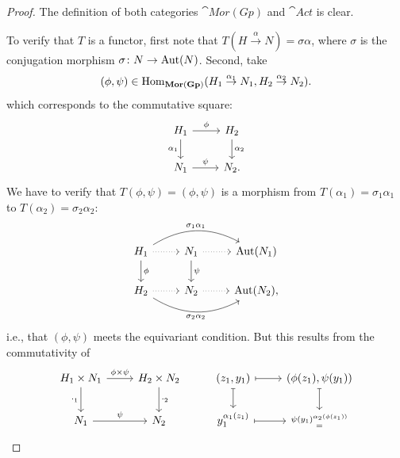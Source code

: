 \begin{proof}
    The definition of both categories $\cat{Mor(Gp)}$ and $\cat{Act}$ is clear.
    
    To verify that $T$ is a functor, first note that $T(H\stackrel\alpha\to N)=\sigma\alpha$, where $\sigma$ is the conjugation morphism $\sigma\colon N\to{\rm Aut}(N)$. Second, take 
    $$
        (\phi,\psi)\in{\rm Hom}_{\mathbf{Mor(Gp)}}
            (H_1\stackrel{\alpha_1}\to N_1, H_2\stackrel{\alpha_2}\to N_2).
    $$
    which corresponds to the commutative square:
    $$
        \begin{tikzcd}
            H_1
                    \arrow[r,"\phi"]
                    \arrow[d,"\alpha_1"']
                &H_2
                    \arrow[d,"\alpha_2"]\\
            N_1
                    \arrow[r,"\psi"]
                &N_2.
        \end{tikzcd}
    $$
    We have to verify that $T(\phi,\psi)=(\phi,\psi)$ is a morphism from $T(\alpha_1)=\sigma_1\alpha_1$ to $T(\alpha_2)=\sigma_2\alpha_2$:
    $$
        \begin{tikzcd}
            H_1
                    \arrow[r,dotted]
                    \arrow[d,"\phi"]
                    \arrow[rr,"\sigma_1\alpha_1",bend left]
                &N_1
                    \arrow[r,dotted]
                    \arrow[d,"\psi"]
                &\Aut(N_1)\\
            H_2
                    \arrow[r,dotted]
                    \arrow[rr,"\sigma_2\alpha_2"',bend right]
                &N_2
                    \arrow[r,dotted]
                &\Aut(N_2),
        \end{tikzcd}
    $$
    i.e., that $(\phi,\psi)$ meets the equivariant condition. But this results from the commutativity of
    $$
        \begin{tikzcd}
            H_1\times N_1
                    \arrow[r,"\phi\times\psi"]
                    \arrow[d,"\cdot_1"']
                &H_2\times N_2
                    \arrow[d,"\cdot_2"]
                &{(z_1,y_1)}
                    \arrow[r,mapsto]
                    \arrow[d,mapsto]
                &{(\phi(z_1),\psi(y_1))}\arrow[d,mapsto]\\
            N_1
                    \arrow[r,"\psi"]
                &N_2
                &y_1^{\alpha_1(z_1)}
                    \arrow[r,mapsto]
                &\substack{\psi(y_1)^{\alpha_2(\phi(z_1))}\\
                    =\\
}
\end{tikzcd}$$
\end{proof}
